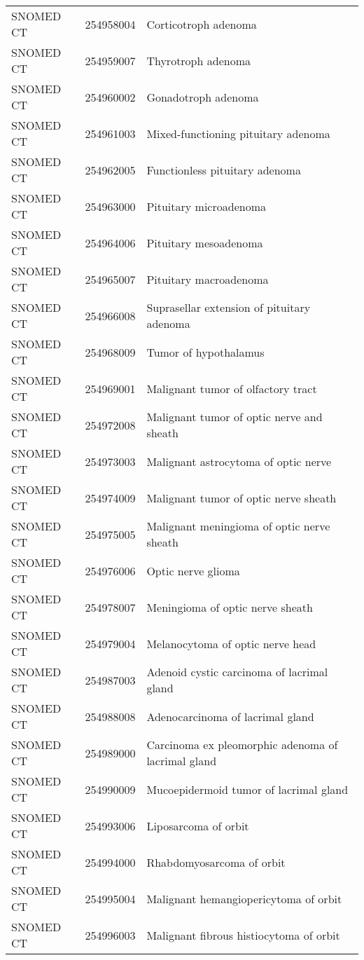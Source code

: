 \begin{longtable}{p{}p{}p{}}
  SNOMED CT & 254958004 & Corticotroph adenoma \\ 
  SNOMED CT & 254959007 & Thyrotroph adenoma \\ 
  SNOMED CT & 254960002 & Gonadotroph adenoma \\ 
  SNOMED CT & 254961003 & Mixed-functioning pituitary adenoma \\ 
  SNOMED CT & 254962005 & Functionless pituitary adenoma \\ 
  SNOMED CT & 254963000 & Pituitary microadenoma \\ 
  SNOMED CT & 254964006 & Pituitary mesoadenoma \\ 
  SNOMED CT & 254965007 & Pituitary macroadenoma \\ 
  SNOMED CT & 254966008 & Suprasellar extension of pituitary adenoma \\ 
  SNOMED CT & 254968009 & Tumor of hypothalamus \\ 
  SNOMED CT & 254969001 & Malignant tumor of olfactory tract \\ 
  SNOMED CT & 254972008 & Malignant tumor of optic nerve and sheath \\ 
  SNOMED CT & 254973003 & Malignant astrocytoma of optic nerve \\ 
  SNOMED CT & 254974009 & Malignant tumor of optic nerve sheath \\ 
  SNOMED CT & 254975005 & Malignant meningioma of optic nerve sheath \\ 
  SNOMED CT & 254976006 & Optic nerve glioma \\ 
  SNOMED CT & 254978007 & Meningioma of optic nerve sheath \\ 
  SNOMED CT & 254979004 & Melanocytoma of optic nerve head \\ 
  SNOMED CT & 254987003 & Adenoid cystic carcinoma of lacrimal gland \\ 
  SNOMED CT & 254988008 & Adenocarcinoma of lacrimal gland \\ 
  SNOMED CT & 254989000 & Carcinoma ex pleomorphic adenoma of lacrimal gland \\ 
  SNOMED CT & 254990009 & Mucoepidermoid tumor of lacrimal gland \\ 
  SNOMED CT & 254993006 & Liposarcoma of orbit \\ 
  SNOMED CT & 254994000 & Rhabdomyosarcoma of orbit \\ 
  SNOMED CT & 254995004 & Malignant hemangiopericytoma of orbit \\ 
  SNOMED CT & 254996003 & Malignant fibrous histiocytoma of orbit \\ 

\end{longtable}
